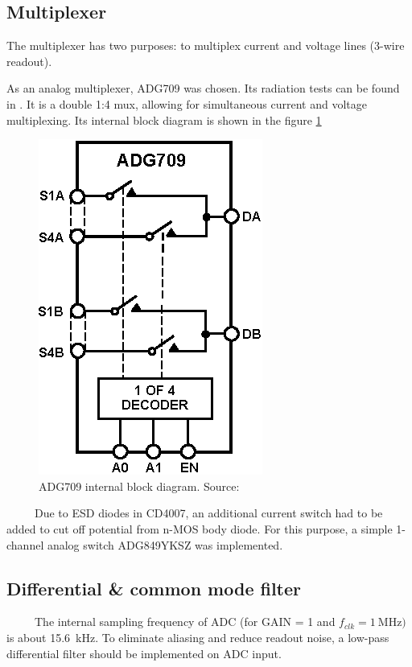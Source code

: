     \subsection{Multiplexer}
        The multiplexer has two purposes: to multiplex current and voltage lines (3-wire readout).

        As an analog multiplexer, ADG709 was chosen. Its radiation tests can be found in \cite{IEEE_radiation_tests_1992_2009}. It is a double 1:4 mux, allowing for simultaneous current and voltage multiplexing. Its internal block diagram is shown in the figure \ref{ADG709_block}

        \begin{figure}[H]
            \centering
            \includegraphics[width=0.2\paperwidth]{img/06/ADG709.eps}
            \caption{ADG709 internal block diagram. Source: \cite{ADG709_datasheet}}
            \label{ADG709_block}
        \end{figure}

        Due to ESD diodes in CD4007, an additional current switch had to be added to cut off potential from n-MOS body diode. For this purpose, a simple 1-channel analog switch ADG849YKSZ was implemented.

    \subsection{Differential \& common mode filter}
        The internal sampling frequency of ADC (for GAIN = 1 and $f_{clk} = \SI{1}{\mega\hertz})$ is about \SI{15.6}{\kilo\hertz}. To eliminate aliasing and reduce readout noise, a low-pass differential filter should be implemented on ADC input.


